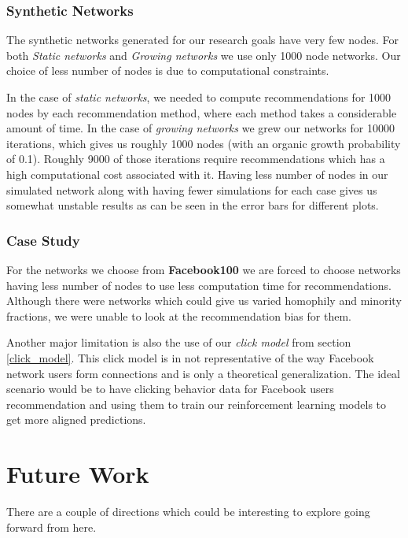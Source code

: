 \subsubsection{Synthetic Networks}
The synthetic networks generated for our research goals have very few nodes. For both \textit{Static networks} and \textit{Growing networks} we use only 1000 node networks. Our choice of less number of nodes is due to computational constraints.

In the case of \textit{static networks}, we needed to compute recommendations for 1000 nodes by each recommendation method, where each method takes a considerable amount of time. In the case of \textit{growing networks} we grew our networks for 10000 iterations, which gives us roughly 1000 nodes (with an organic growth probability of 0.1). Roughly 9000 of those iterations require recommendations which has a high computational cost associated with it. Having less number of nodes in our simulated network along with having fewer simulations for each case gives us somewhat unstable results as can be seen in the error bars for different plots.

\subsubsection{Case Study}
For the networks we choose from \textbf{Facebook100} we are forced to choose networks having less number of nodes to use less computation time for recommendations. Although there were networks which could give us varied homophily and minority fractions, we were unable to look at the recommendation bias for them.

Another major limitation is also the use of our \textit{click model} from section \ref{click_model}. This click model is in not representative of the way Facebook network users form connections and is only a theoretical generalization. The ideal scenario would be to have clicking behavior data for Facebook users recommendation and using them to train our reinforcement learning models to get more aligned predictions.

\section{Future Work}

There are a couple of directions which could be interesting to explore going forward from here.

